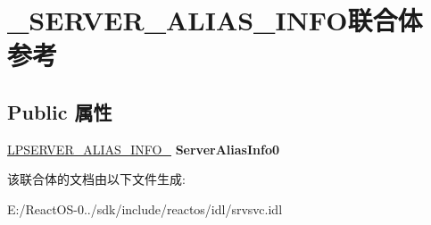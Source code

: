 \hypertarget{union___s_e_r_v_e_r___a_l_i_a_s___i_n_f_o}{}\section{\+\_\+\+S\+E\+R\+V\+E\+R\+\_\+\+A\+L\+I\+A\+S\+\_\+\+I\+N\+F\+O联合体 参考}
\label{union___s_e_r_v_e_r___a_l_i_a_s___i_n_f_o}
\subsection*{Public 属性}
\begin{DoxyCompactItemize}
\item 
\mbox{\label{union___s_e_r_v_e_r___a_l_i_a_s___i_n_f_o_a40bf614378de861eb7f6081ffe104744}} 
\hyperlink{struct___s_e_r_v_e_r___a_l_i_a_s___i_n_f_o__0}{L\+P\+S\+E\+R\+V\+E\+R\+\_\+\+A\+L\+I\+A\+S\+\_\+\+I\+N\+F\+O\+\_} {\bfseries Server\+Alias\+Info0}
\end{DoxyCompactItemize}


该联合体的文档由以下文件生成\+:\begin{DoxyCompactItemize}
\item 
E\+:/\+React\+O\+S-\/0../sdk/include/reactos/idl/srvsvc.\+idl\end{DoxyCompactItemize}
